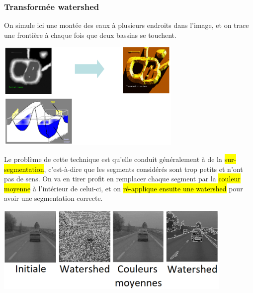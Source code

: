 \documentclass[letterpaper, 12pt]{article}
\newcommand{\alinea}{
\hspace*{0.5cm}}
\newcommand{\red}[1]{
	\textcolor{red}{#1}}
\begin{document}
		\subsubsection{Transformée watershed}
			\alinea On simule ici une montée des eaux à plusieurs endroits dans l'image, et on trace une frontière à chaque fois
				que deux bassins se touchent.
			\begin{center}
				\includegraphics[width=3.5in]{Images/watershed}
			\end{center}
			Le problème de cette technique est qu'elle conduit généralement à de la \red{\hl{sur-segmentation}}, c'est-à-dire que 
			les segments considérés sont trop petits et n'ont pas de sens. On va en tirer profit en remplacer chaque segment par la
			\hl{couleur moyenne} à l'intérieur de celui-ci, et on \hl{ré-applique ensuite une watershed} pour avoir une segmentation
			correcte.
			\begin{center}
				\includegraphics[width=4.5in]{Images/oversegmentation}
			\end{center}
\end{document}
